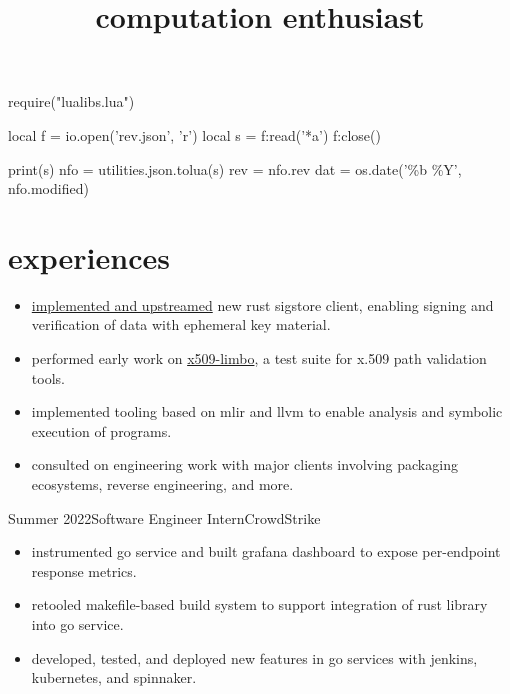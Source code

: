 \documentclass{moderncv}
\title{computation enthusiast}
\begin{document}
\begin{luacode}
require("lualibs.lua")

local f = io.open('rev.json', 'r')
local s = f:read('*a')
f:close()

print(s)
nfo = utilities.json.tolua(s)
rev = nfo.rev
dat = os.date('\%b \%Y', nfo.modified)
\end{luacode}

\newcommand{\githash}
{
  \href{https://github.com/tnytown/website/blob/\luadirect{tex.sprint(rev)}/resume.tex}
  {\texttt{\luadirect{tex.sprint(rev)}}}}
\newcommand{\lastmodified}{\luadirect{tex.sprint(dat)}}

\makecvtitle{}
\vspace*{-15mm} %

\section{experiences}
{
  \begin{itemize}[label=\rightarrow,noitemsep]
  \item \href{https://github.com/sigstore/sigstore-rs/issues?q=is\%3Apr\%20author\%3A\%40tnytown\%20OR\%20author\%3A\%40jleightcap}{implemented and upstreamed} new rust sigstore client, enabling signing and verification of data with ephemeral key material.
  \item performed early work on \href{https://github.com/C2SP/x509-limbo}{x509-limbo}, a test suite for x.509 path validation tools.
  \item implemented tooling based on mlir and llvm to enable analysis and symbolic execution of programs.
  \item consulted on engineering work with major clients involving packaging ecosystems, reverse engineering, and more.
  \end{itemize}
}
\cventry
    {Summer 2022}{Software Engineer Intern}{CrowdStrike}{}{}
    {
      \begin{itemize}[label=\rightarrow,noitemsep]
      \item instrumented go service and built grafana dashboard to expose per-endpoint response metrics.
      \item retooled makefile-based build system to support integration of rust library into go service.
      \item developed, tested, and deployed new features in go services with jenkins, kubernetes, and spinnaker.
      \end{itemize}
    }
\end{document}
